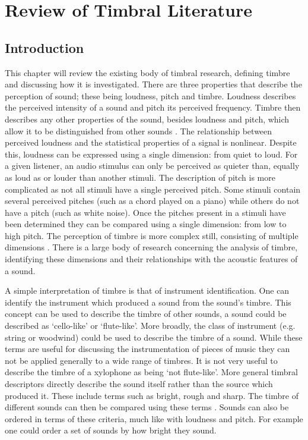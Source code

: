 
\chapter{Review of Timbral Literature}
\label{chap:Timbre}

\section{Introduction}
\label{sec:Timbre-Introduction}
	This chapter will review the existing body of timbral research, defining timbre and discussing how it is
	investigated. There are three properties that describe the perception of sound; these being loudness, pitch and
	timbre.  Loudness describes the perceived intensity of a sound and pitch its perceived frequency. Timbre then
	describes any other properties of the sound, besides loudness and pitch, which allow it to be distinguished from
	other sounds \citep{mathews1999introduction}. The relationship between perceived loudness and the statistical
	properties of a signal is nonlinear. Despite this, loudness can be expressed using a single dimension: from quiet
	to loud. For a given listener, an audio stimulus can only be perceived as quieter than, equally as loud as or
	louder than another stimuli. The description of pitch is more complicated as not all stimuli have a single
	perceived pitch. Some stimuli contain several perceived pitches (such as a chord played on a piano) while others do
	not have a pitch (such as white noise). Once the pitches present in a stimuli have been determined they can be
	compared using a single dimension: from low to high pitch. The perception of timbre is more complex still,
	consisting of multiple dimensions \citep{rossing2002the}. There is a large body of research concerning the analysis
	of timbre, identifying these dimensions and their relationships with the acoustic features of a sound.

	A simple interpretation of timbre is that of instrument identification. One can identify the instrument which
	produced a sound from the sound's timbre. This concept can be used to describe the timbre of other sounds, a sound
	could be described as `cello-like' or `flute-like'. More broadly, the class of instrument (e.g. string or woodwind)
	could be used to describe the timbre of a sound. While these terms are useful for discussing the instrumentation of
	pieces of music they can not be applied generally to a wide range of timbres. It is not very useful to describe the
	timbre of a xylophone as being `not flute-like'. More general timbral descriptors directly describe the sound
	itself rather than the source which produced it. These include terms such as bright, rough and sharp. The timbre of
	different sounds can then be compared using these terms \citep{howard2009acoustics}. Sounds can also be ordered in
	terms of these criteria, much like with loudness and pitch. For example one could order a set of sounds by how
	bright they sound.

